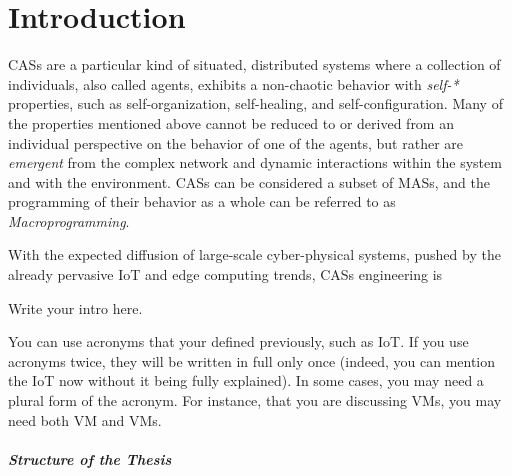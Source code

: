 \chapter{Introduction}
\label{chap:introduction}
\acp{CAS} are a particular kind of situated, distributed systems where a collection of individuals, also called agents, exhibits a non-chaotic behavior with \textit{self-*} properties, such as self-organization, self-healing, and self-configuration\cite{macroprogramming-state-of-the-art}.
%
Many of the properties mentioned above cannot be reduced to or derived from an individual perspective on the behavior of one of the agents, but rather are \textit{emergent} from the complex network and dynamic interactions within the system and with the environment\cite{macroprogramming-state-of-the-art}.
%
\acp{CAS} can be considered a subset of \acp{MAS}, and the programming of their behavior as a whole can be referred to as \textit{Macroprogramming}\cite{macroprogramming-state-of-the-art}.

With the expected diffusion of large-scale cyber-physical systems, pushed by the already pervasive \ac{IoT} and edge computing trends\cite{scafi}, \acp{CAS} engineering is 



Write your intro here.

You can use acronyms that your defined previously,
such as \ac{IoT}.
%
If you use acronyms twice,
they will be written in full only once
(indeed, you can mention the \ac{IoT} now without it being fully explained).
%
In some cases, you may need a plural form of the acronym.
%
For instance,
that you are discussing \acp{VM},
you may need both \ac{VM} and \acp{VM}.

\paragraph{Structure of the Thesis}

